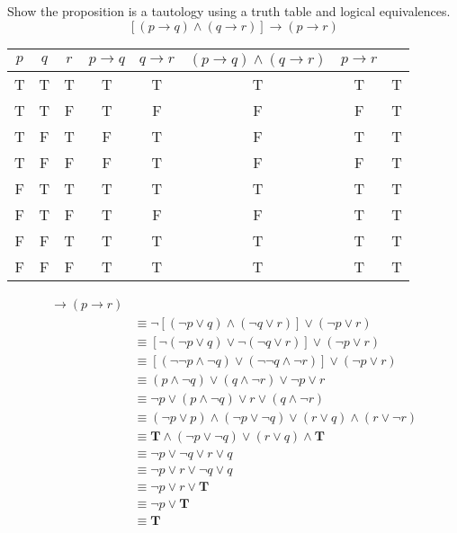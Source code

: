 \documentclass[12pt,addpoints]{exam}
\newcommand{\ra}{\rightarrow}
\begin{document}
\begin{questions}
\question Show the proposition is a tautology using a truth table
and logical equivalences.
 \[ [(p \rightarrow q) \wedge (q \rightarrow r)] \rightarrow (p \rightarrow r) \]
    \ifprintanswers
        \vspace{-25pt}
    \fi
    \begin{solution}

    \begin{tabular}{|c|c|c||ccccc|}
        $p$ & $q$ & $r$ & $p \ra q$ & $q \ra r$ & $(p \ra q) \wedge (q \ra r)$ & $p \ra r$ &  \\
        \hline
        T & T & T & T & T & T & T & T \\
        T & T & F & T & F & F & F & T \\
        T & F & T & F & T & F & T & T \\
        T & F & F & F & T & F & F & T \\
        F & T & T & T & T & T & T & T \\
        F & T & F & T & F & F & T & T \\
        F & F & T & T & T & T & T & T \\
        F & F & F & T & T & T & T & T \\
    \end{tabular}

    \begin{align*}
    [(p \rightarrow q) &\wedge (q \rightarrow r)] \rightarrow (p \rightarrow r) \\
     & \equiv \neg [ (\neg p \vee q) \wedge (\neg q \vee r)] \vee (\neg p \vee r) \tag{Table 7, rule 1, x4}\\
     & \equiv [\neg (\neg p \vee q) \vee \neg (\neg q \vee r)] \vee (\neg p \vee r) \tag{DeMorgan's} \\
     & \equiv [(\neg \neg p \wedge \neg q) \vee (\neg \neg q \wedge \neg r)] \vee (\neg p \vee r) \tag{DeMorgan's, x2} \\
     & \equiv (p \wedge \neg q) \vee (q \wedge \neg r) \vee \neg p \vee r \tag{Double Negation, x2} \\
     & \equiv \neg p \vee (p \wedge \neg q) \vee r \vee (q \wedge \neg r) \tag{Commutative} \\
     & \equiv (\neg p \vee p) \wedge (\neg p \vee \neg q) \vee (r \vee q) \wedge (r \vee \neg r) \tag{Distributive, x2} \\
     & \equiv \mathbf{T} \wedge (\neg p \vee \neg q) \vee (r \vee q) \wedge \mathbf{T} \tag{Negation, x2} \\
     & \equiv \neg p \vee \neg q \vee r \vee q \tag{Identity, x2} \\
     & \equiv \neg p \vee r \vee \neg q \vee q \tag{Commutative} \\
     & \equiv \neg p \vee r \vee \mathbf{T} \tag{Negation} \\
     & \equiv \neg p \vee \mathbf{T} \tag{Domination} \\
     & \equiv \mathbf{T} \tag{Domination}
     \end{align*}
    \end{solution}



\end{questions}
\end{document}
